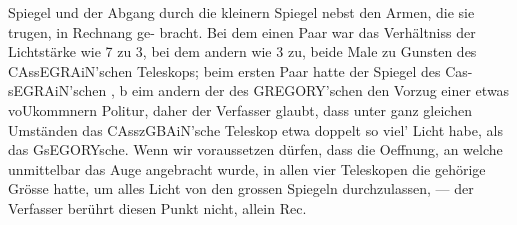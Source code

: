 \documentclass[12pt,a4paper]{article}
\begin{document}
Spiegel und der Abgang durch die kleinern Spiegel nebst den Armen, die sie trugen, in Rechnang ge-\newline
bracht. Bei dem einen Paar war das Verhältniss der Lichtstärke wie 7 zu 3, bei dem andern wie 3 zu, beide Male zu Gunsten des CAssEGRAiN'schen Teleskops; beim ersten Paar hatte der Spiegel des Cas-\newline
sEGRAiN'schen , b eim andern der des GREGORY'schen den Vorzug einer etwas voUkommnern Politur, daher\newline
der Verfasser glaubt, dass unter ganz gleichen Umständen das CAsszGBAiN'sche Teleskop etwa doppelt\newline
so viel' Licht habe, als das GsEGORYsche. Wenn wir voraussetzen dürfen, dass die Oeffnung, an welche\newline
unmittelbar das Auge angebracht wurde, in allen vier Teleskopen die gehörige Grösse hatte, um alles\newline
Licht von den grossen Spiegeln durchzulassen, --- der Verfasser berührt diesen Punkt nicht, allein Rec.\newline
\end{document}
